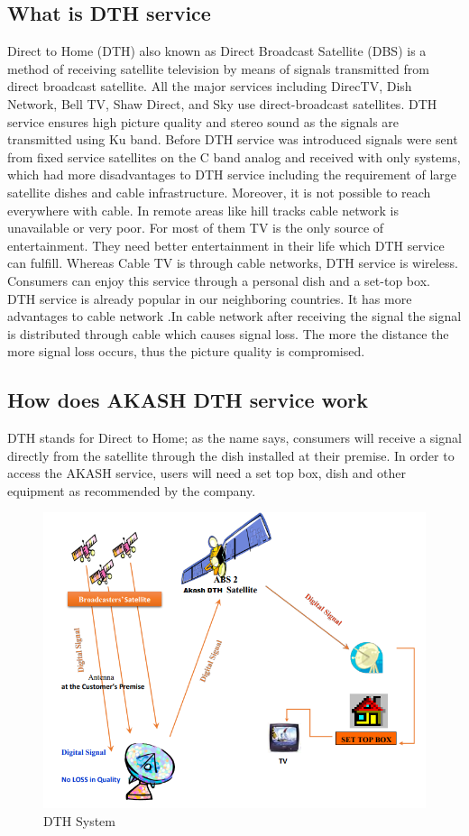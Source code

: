 \begin{spacing}{1.0}
\subsection{What is DTH service}
Direct to Home (DTH) also known as Direct Broadcast Satellite (DBS) is a method of receiving satellite television by means of signals transmitted from direct broadcast satellite. All the major services including DirecTV, Dish Network, Bell TV, Shaw Direct, and Sky use direct-broadcast satellites. DTH service ensures high picture quality and stereo sound as the signals are transmitted using Ku band.
Before DTH service was introduced signals were sent from fixed service satellites on the C band analog and received with only systems, which had more disadvantages to DTH service including the requirement of large satellite dishes and cable infrastructure. Moreover, it is not possible to reach everywhere with cable. In remote areas like hill tracks cable network is unavailable or very poor. For most of them TV is the only source of entertainment. They need better entertainment in their life which DTH service can fulfill. Whereas Cable TV is through cable networks, DTH service is wireless. Consumers can enjoy this service through a personal dish and a set-top box. DTH service is already popular in our neighboring countries. It has more advantages to cable network .In cable network after receiving the signal the signal is distributed through cable which causes signal loss. The more the distance the more signal loss occurs, thus the picture quality is compromised.
\subsection{How does AKASH DTH service work}
DTH stands for Direct to Home; as the name says, consumers will receive a signal directly from the satellite through the dish installed at their premise. In order to access the AKASH service, users will need a set top box, dish and other equipment as recommended by the company. 

\begin{figure}[H]
	\centering
	\includegraphics[width=\textwidth]{connection}
	\caption{DTH System}
	\label{fig:connection}
\end{figure}


\end{spacing}
